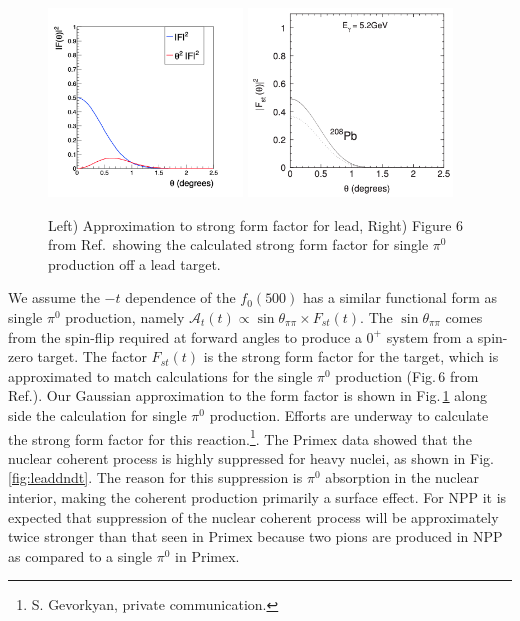  \begin{figure}[tbh]
\begin{center}
\includegraphics[height=5cm,clip=true]{figures/fit_Primakoff_sigma_c1.png}
\includegraphics[height=5cm,clip=true]{figures/PRC80_2009_Fig6.png}
\caption{ Left) Approximation to strong form factor for lead, Right) Figure 6 from Ref.\,\cite{Gevorkyan:2009ge} showing the calculated strong form factor for single $\pi^0$ production off a lead target.
\label{fig:strongFF}}
\end{center}
\end{figure}

We assume the $-t$ dependence of the $f_0(500)$ has a similar functional form as single $\pi^0$ production, namely $\mathcal{A}_t(t) \propto \sin{\theta_{\pi\pi}} \times F_{st}(t)$.  The $\sin{\theta_{\pi\pi}}$ 
comes from the spin-flip required at forward angles to produce a $0^+$ system from a spin-zero target. The factor $F_{st}(t)$ is the strong form factor for the target, which is approximated to
match calculations for the single $\pi^0$ production (Fig.\,6 from Ref.\cite{Gevorkyan:2009ge}). Our Gaussian approximation to the form factor is shown in Fig.\,\ref{fig:strongFF} along side the calculation for single 
$\pi^0$ production. Efforts are underway to calculate the strong form factor for this reaction.\footnote{S. Gevorkyan, private communication.}.
The Primex data showed that the nuclear coherent process is highly
suppressed for heavy nuclei, as shown in Fig.\ref{fig:leaddndt}.  The reason for this suppression is
$\pi^0$ absorption in the nuclear interior, making the coherent
production primarily a surface effect.  For NPP it is expected that suppression of the nuclear  
coherent process will be approximately twice stronger than that seen in Primex because two pions
are produced in NPP as compared to a single $\pi^0$ in Primex. 

